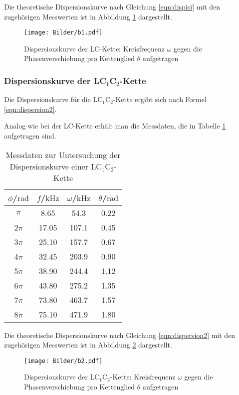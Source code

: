 Die theoretische Dispersionskurve nach Gleichung \eqref{eqn:dispisi} mit den zugehörigen
Messwerten ist in Abbildung \ref{fig:dispilc} dargestellt.

\begin{figure}
	\centering
	\texttt{[image: Bilder/b1.pdf]}
	\caption{Dispersionskurve der LC-Kette: Kreisfrequenz $\omega$ gegen die Phasenverschiebung pro Kettenglied $\theta$ aufgetragen}
	\label{fig:dispilc}
\end{figure}

\FloatBarrier
\subsubsection{Dispersionskurve der LC$_1$C$_2$-Kette}
Die Dispersionskurve für die LC$_1$C$_2$-Kette ergibt sich nach Formel \eqref{eqn:dispersion2}.

Analog wie bei der LC-Kette erhält man die Messdaten, die in Tabelle \ref{tab:dispersioncc}
aufgetragen sind.

\begin{table}
	\caption{Messdaten zur Untersuchung der Dispersionskurve einer LC$_1$C$_2$-Kette}
	\label{tab:dispersioncc}
	\centering
	\begin{tabular}{cccc}
	\toprule
	$\phi$/$\si{\radian}$ & $f$/$\si{\kilo\Hz}$ & $\omega$/$\si{\kilo\Hz}$ & $\theta$/$\si{\radian}$ \\
	\midrule
		$\pi$ & 8.65 & 54.3 & 0.22 \\
		2$\pi$ & 17.05 & 107.1 & 0.45 \\
		3$\pi$ & 25.10 & 157.7 & 0.67 \\
		4$\pi$ & 32.45 & 203.9 & 0.90 \\
		5$\pi$ & 38.90 & 244.4 & 1.12 \\
		6$\pi$ & 43.80 & 275.2 & 1.35 \\
		7$\pi$ & 73.80 & 463.7 & 1.57 \\
		8$\pi$ & 75.10 & 471.9 & 1.80 \\
	\bottomrule
	\end{tabular}
\end{table}

Die theoretische Dispersionskurve nach Gleichung \eqref{eqn:dispersion2} mit den zugehörigen Messwerten ist in Abbildung \ref{fig:dispicc} dargestellt. 

\begin{figure}
	\centering
	\texttt{[image: Bilder/b2.pdf]}
	\caption{Dispersionskurve der LC$_1$C$_2$-Kette: Kreisfrequenz $\omega$ gegen die Phasenverschiebung pro Kettenglied $\theta$ aufgetragen}
	\label{fig:dispicc}
\end{figure}



